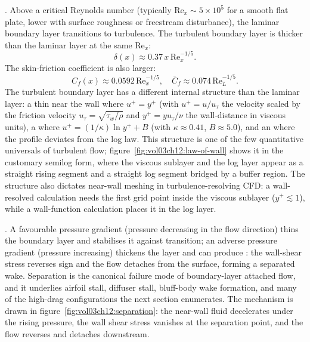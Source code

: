 . Above a critical Reynolds
number (typically $\text{Re}_x \sim 5\times 10^5$ for a smooth
flat plate, lower with surface roughness or freestream disturbance),
the laminar boundary layer transitions to turbulence. The turbulent
boundary layer is thicker than the laminar layer at the same
$\text{Re}_x$:
\[
\delta(x) \approx 0.37\,x\,\text{Re}_x^{-1/5}.
\]
The skin-friction coefficient is also larger:
\[
C_f(x) \approx 0.0592\,\text{Re}_x^{-1/5}, \quad
\bar{C}_f \approx 0.074\,\text{Re}_L^{-1/5}.
\]
The turbulent boundary layer has a different internal structure
than the laminar layer: a thin  near the
wall where $u^+ = y^+$ (with $u^+ = u/u_\tau$ the velocity scaled
by the friction velocity $u_\tau = \sqrt{\tau_w/\rho}$ and $y^+ =
y u_\tau/\nu$ the wall-distance in viscous units), a  where $u^+ = (1/\kappa)\ln y^+ + B$ (with $\kappa \approx
0.41$, $B \approx 5.0$), and an  where
the profile deviates from the log law. This  structure is one of the few quantitative universals of
turbulent flow; figure~\ref{fig:vol03ch12:law-of-wall} shows it in
the customary semilog form, where the viscous sublayer and the log
layer appear as a straight rising segment and a straight log
segment bridged by a buffer region. The structure also dictates
near-wall meshing in turbulence-resolving CFD: a wall-resolved
calculation needs the first grid point inside the viscous sublayer
($y^+\lesssim1$), while a wall-function calculation places it in
the log layer.



. A favourable pressure
gradient (pressure decreasing in the flow direction) thins the
boundary layer and stabilises it against transition; an adverse
pressure gradient (pressure increasing) thickens the layer and
can produce : the wall-shear stress reverses
sign and the flow detaches from the surface, forming a separated
wake. Separation is the canonical failure mode of boundary-layer
attached flow, and it underlies airfoil stall, diffuser stall,
bluff-body wake formation, and many of the high-drag
configurations the next section enumerates. The mechanism is drawn
in figure~\ref{fig:vol03ch12:separation}: the near-wall fluid
decelerates under the rising pressure, the wall shear stress
vanishes at the separation point, and the flow reverses and
detaches downstream.

